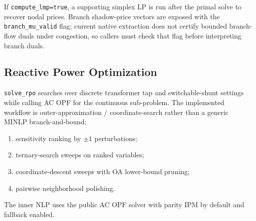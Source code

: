 If \texttt{compute\_lmp=true}, a supporting simplex LP is run after the primal
solve to recover nodal prices.  Branch shadow-price vectors are exposed with the
\texttt{branch\_mu\_valid} flag; current native extraction does not certify
bounded branch-flow duals under congestion, so callers must check that flag
before interpreting branch duals.

\subsection{Reactive Power Optimization}
\label{sec:rpo}

\texttt{solve\_rpo} searches over discrete transformer tap and switchable-shunt
settings while calling AC OPF for the continuous sub-problem.  The implemented
workflow is outer-approximation / coordinate-search rather than a generic MINLP
branch-and-bound:
\begin{enumerate}
  \item sensitivity ranking by \(\pm1\) perturbations;
  \item ternary-search sweeps on ranked variables;
  \item coordinate-descent sweeps with OA lower-bound pruning;
  \item pairwise neighborhood polishing.
\end{enumerate}
The inner NLP uses the public AC OPF solver with parity IPM by default and
fallback enabled.
